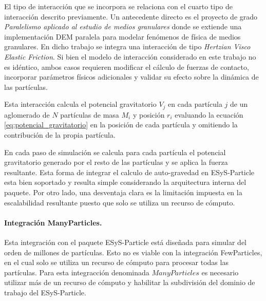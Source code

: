 \documentclass[a4paper,11pt]{book}
\begin{document}
El tipo de interacción que se incorpora se relaciona con el cuarto tipo de interacción descrito previamente. Un antecedente directo es el proyecto de grado \textit{Paralelismo aplicado al estudio de medios granulares} \cite{24} donde se extiende una implementación DEM paralela para modelar fenómenos de física de medios granulares. En dicho trabajo se integra una interacción de tipo \textit{Hertzian Visco Elastic Friction}. Si bien el modelo de interacción considerado en este trabajo no es idéntico, ambos casos requieren modificar el cálculo de fuerzas de contacto, incorporar parámetros físicos adicionales y validar su efecto sobre la dinámica de las partículas.



Esta interacción calcula el potencial gravitatorio $V_j$ en cada partícula $j$ de un aglomerado de $N$ partículas de masa $M_i$ y posición $r_i$ evaluando la ecuación \ref{eq:potencial_gravitatorio} en la posición de cada partícula y omitiendo la contribución de la propia partícula.

En cada paso de simulación se calcula para cada partícula el potencial gravitatorio generado por el resto de las partículas y se aplica la fuerza resultante. Esta forma de integrar el calculo de auto-gravedad en ESyS-Particle esta bien soportado y resulta simple considerando la arquitectura interna del paquete. Por otro lado, una desventaja clara es la limitación impuesta en la escalabilidad resultante puesto que solo se utiliza un recurso de cómputo.


\paragraph{Integración ManyParticles.}
Esta integración con el paquete ESyS-Particle está diseñada para simular del orden de millones de partículas. Esto no es viable con la integración FewParticles, en el cual solo se utiliza un recurso de cómputo para procesar todas las partículas. Para esta integracción denominada $ManyParticles$ es necesario utilizar más de un recurso de cómputo y habilitar la subdivisión del dominio de trabajo del ESyS-Particle.
\end{document}
